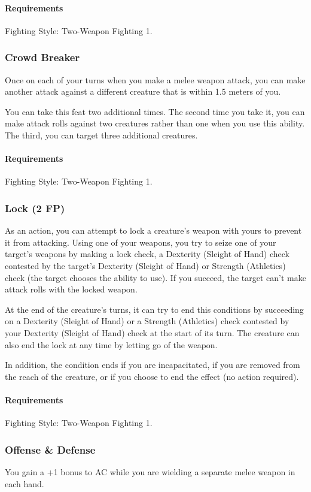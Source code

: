     \paragraph{Requirements} Fighting Style: Two-Weapon Fighting 1.
\subsubsection{Crowd Breaker} \label{feat::crowdbreaker}
    Once on each of your turns when you make a melee weapon attack, you can make another attack against a different creature that is within 1.5 meters of you.

    You can take this feat two additional times.
    The second time you take it, you can make attack rolls against two creatures rather than one when you use this ability.
    The third, you can target three additional creatures.
    \paragraph{Requirements} Fighting Style: Two-Weapon Fighting 1.
\subsubsection{Lock (2 FP)} \label{feat::lock}
    As an action, you can attempt to lock a creature's weapon with yours to prevent it from attacking.
    Using one of your weapons, you try to seize one of your target's weapons by making a lock check, a Dexterity (Sleight of Hand) check contested by the target's Dexterity (Sleight of Hand) or Strength (Athletics) check (the target chooses the ability to use).
    If you succeed, the target can't make attack rolls with the locked weapon.

    At the end of the creature's turns, it can try to end this conditions by succeeding on a Dexterity (Sleight of Hand) or a Strength (Athletics) check contested by your Dexterity (Sleight of Hand) check at the start of its turn.
    The creature can also end the lock at any time by letting go of the weapon.

    In addition, the condition ends if you are incapacitated, if you are removed from the reach of the creature, or if you choose to end the effect (no action required).
    \paragraph{Requirements} Fighting Style: Two-Weapon Fighting 1.
\subsubsection{Offense \& Defense} \label{feat::offenseanddefense}
    You gain a +1 bonus to AC while you are wielding a separate melee weapon in each hand.
